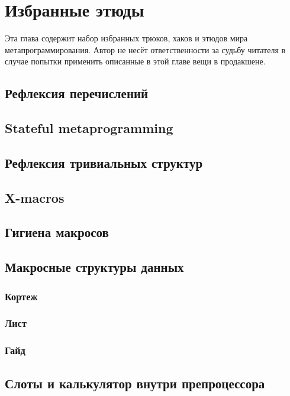 \chapter{Избранные этюды}
Эта глава содержит набор избранных трюков, хаков и этюдов мира метапрограммирования. Автор не несёт ответственности за судьбу читателя в случае попытки применить описанные в этой главе вещи в продакшене.

\section{Рефлексия перечислений}

\section{Stateful metaprogramming}

\section{Рефлексия тривиальных структур}

\section{X-macros}

\section{Гигиена макросов}

\section{Макросные структуры данных}
\subsection{Кортеж}
\subsection{Лист}
\subsection{Гайд}

\section{Слоты и калькулятор внутри препроцессора}
